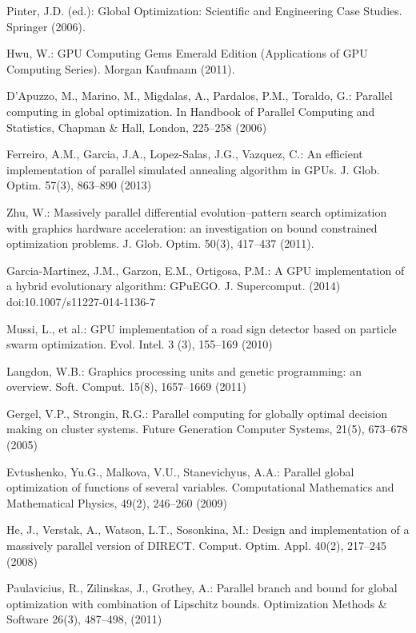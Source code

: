 \documentclass[smallcondensed]{svjour3}     %
\begin{document}
\begin{thebibliography}{}

Pinter, J.D. (ed.): Global Optimization: Scientific and Engineering Case Studies. Springer (2006).

Hwu, W.: GPU Computing Gems Emerald Edition (Applications of GPU Computing Series). Morgan Kaufmann (2011).

D'Apuzzo, M.,  Marino, M., Migdalas, A., Pardalos, P.M., Toraldo, G.: Parallel computing in global optimization. In Handbook of Parallel Computing and Statistics, Chapman \& Hall, London, 225--258 (2006)

Ferreiro, A.M., Garcia, J.A., Lopez-Salas, J.G., Vazquez, C.: An efficient implementation of parallel simulated annealing algorithm in GPUs. J. Glob. Optim. 57(3), 863--890 (2013)

Zhu, W.: Massively parallel differential evolution--pattern search optimization with graphics hardware acceleration: an investigation on bound constrained optimization problems. J. Glob. Optim. 50(3), 417--437 (2011).

Garcia-Martinez, J.M., Garzon, E.M., Ortigosa, P.M.: A GPU implementation of a hybrid evolutionary algorithm: GPuEGO. J. Supercomput. (2014) doi:10.1007/s11227-014-1136-7 

Mussi, L., et al.: GPU implementation of a road sign detector based on particle swarm optimization. Evol. Intel. 3 (3), 155--169 (2010)

Langdon, W.B.: Graphics processing units and genetic programming: an overview. Soft. Comput. 15(8), 1657--1669 (2011)

Gergel, V.P., Strongin, R.G.: Parallel computing for globally optimal decision making on cluster systems. Future Generation Computer Systems, 21(5), 673--678 (2005)

Evtushenko, Yu.G., Malkova, V.U., Stanevichyus, A.A.: Parallel global optimization of functions of several variables. Computational Mathematics and Mathematical Physics, 49(2), 246--260 (2009)

He, J., Verstak, A., Watson, L.T., Sosonkina, M.: Design and implementation of a massively parallel version of DIRECT. Comput. Optim. Appl. 40(2), 217--245 (2008)

Paulavicius, R., Zilinskas, J., Grothey, A.: Parallel branch and bound for global optimization with combination of Lipschitz bounds. Optimization Methods \& Software 26(3), 487--498, (2011)


\end{thebibliography}
\end{document}
